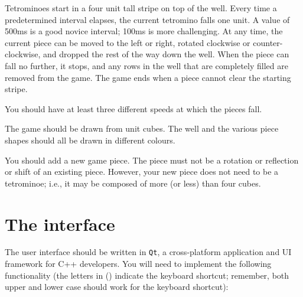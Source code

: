 Tetrominoes start in a four unit tall stripe on top of the well.
Every time a predetermined interval elapses, the current tetromino
falls one unit.  A value of 500ms is a good novice interval; 100ms is more
challenging.  At any time, the current piece can be moved to
the left or right, rotated clockwise or counter-clockwise, and
dropped the rest of the way down the well.  When the piece can
fall no further, it stops, and any rows in the well that are completely
filled are removed from the game.  The game ends when a piece
cannot clear the starting stripe.

You should have at least three different speeds at which the pieces fall.

The game should be drawn from unit cubes.  The well and the
various piece shapes should all be drawn in different colours.

You should add a new game piece.  The piece must not be a rotation or
reflection or shift of an existing piece.  However, your new piece
does not need to be a tetrominoe; i.e., it may be composed of more (or less)
than four cubes.

\section{The interface}

The user interface should be written in \texttt{Qt}, a cross-platform
application and UI framework for C++ developers. You will need to
implement the following functionality (the letters in () indicate the
keyboard shortcut; remember, both upper and lower case should work for
the keyboard shortcut):

